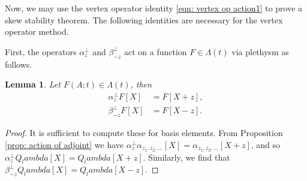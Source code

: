\documentclass[12pt]{amsart}%
\def\lambda{lambda}%
\newtheorem{proposition}[theorem]{Proposition}
\newtheorem{lemma}[theorem]{Lemma}
\theoremstyle{remark}
\theoremstyle{definition}
\begin{document}

    Now, we may use the vertex operator identity \eqref{eqn: vertex op action1} to prove a skew stability theorem. The following identities are necessary for the vertex operator method.

    First, the operators $\alpha_z^\perp$ and $\beta_{-z}^\perp$ act on a function $F\in\Lambda(t)$ via plethysm as follows.
    \begin{lemma}
        Let $F(A;t)\in\Lambda(t)$, then
        \begin{align*}
            \alpha_z^\perp F[X]&=F[X+z],\\
            \beta_{-z}^\perp F[X]&=F[X-z].
        \end{align*}
    \end{lemma}

    \begin{proof}
        It is sufficient to compute these for basis elements. From Proposition \ref{prop: action of adjoint} we have $\alpha_{z}^\perp\alpha_{z_1,z_2,\ldots}[X]=\alpha_{z_1,z_2,\ldots}[X+z]$, and so $\alpha_z^\perp Q_\lambda[X]=Q_\lambda[X+z]$. Similarly, we find that $\beta_{-z}^\perp Q_\lambda[X]=Q_\lambda[X-z]$.
    \end{proof}
\end{document}
